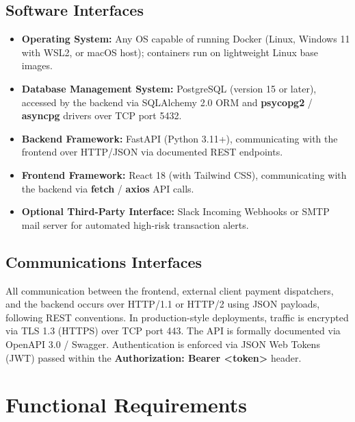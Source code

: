 \documentclass[12pt, a4paper]{report}
\begin{document}
\subsection{Software Interfaces}
\begin{itemize}
    \item \textbf{Operating System:} Any OS capable of running Docker (Linux, Windows 11 with WSL2, or macOS host); containers run on lightweight Linux base images.
    \item \textbf{Database Management System:} PostgreSQL (version 15 or later), accessed by the backend via SQLAlchemy 2.0 ORM and \textbf{psycopg2} / \textbf{asyncpg} drivers over TCP port 5432.
    \item \textbf{Backend Framework:} FastAPI (Python 3.11+), communicating with the frontend over HTTP/JSON via documented REST endpoints.
    \item \textbf{Frontend Framework:} React 18 (with Tailwind CSS), communicating with the backend via \textbf{fetch} / \textbf{axios} API calls.
    \item \textbf{Optional Third-Party Interface:} Slack Incoming Webhooks or SMTP mail server for automated high-risk transaction alerts.
\end{itemize}

\subsection{Communications Interfaces}
All communication between the frontend, external client payment dispatchers, and the backend occurs over HTTP/1.1 or HTTP/2 using JSON payloads, following REST conventions. In production-style deployments, traffic is encrypted via TLS 1.3 (HTTPS) over TCP port 443. The API is formally documented via OpenAPI 3.0 / Swagger. Authentication is enforced via JSON Web Tokens (JWT) passed within the \textbf{Authorization: Bearer <token>} header.

\section{Functional Requirements}
\end{document}
